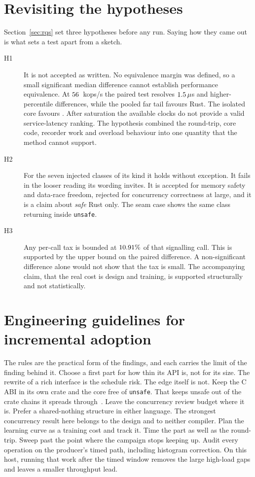 \documentclass[english,oneside,a4paper,censored,csm,software-track-2020]{HYthesisML}
\begin{document}
\section{Revisiting the hypotheses}\label{sec:hypotheses}
Section~\ref{sec:rqs} set three hypotheses before any run.
Saying how they came out is what sets a test apart from a sketch.

\begin{description}
  \item[H1] It is not accepted as written. No equivalence margin was defined,
        so a small significant median difference cannot establish
        performance equivalence. At $56$~kops/s the paired test resolves
        $1.5\,\mu$s and higher-percentile differences, while the
        pooled far tail favours Rust. The isolated core favours
        \BudgetCoreFaster{}. After saturation the available clocks do not
        provide a valid service-latency ranking. The hypothesis combined the
        round-trip, core code, recorder work and overload behaviour into one
        quantity that the method cannot support.
  \item[H2] For the seven injected classes of its kind it holds without
        exception. It fails in the looser reading its wording invites. It is
        accepted for memory safety and data-race freedom, rejected for
        concurrency correctness at large, and it is a claim about \emph{safe}
        Rust only. The seam case shows the same class returning inside
        \texttt{unsafe}.
  \item[H3] Any per-call tax is bounded at $10.91\%$ of that signalling call. This is
        supported by the upper bound on the paired difference. A non-significant
        difference alone would not show that the tax is small. The accompanying claim, that the real
        cost is design and training, is supported structurally and not
        statistically.
\end{description}

\section{Engineering guidelines for incremental adoption}\label{sec:guidelines}
The rules are the practical form of the findings, and each carries the
limit of the finding behind it. Choose a first part for how thin its API is,
not for its size. The rewrite of a rich interface is the
schedule risk. The edge itself is not. Keep the C ABI in its own crate and
the core free of \texttt{unsafe}. That keeps unsafe out of the crate
chains it spreads through~\cite{evans2020rust}. Leave the
concurrency review budget where it is. Prefer a shared-nothing structure in
either language. The strongest concurrency result here belongs to the design and
to neither compiler. Plan the learning curve as a training cost and track
it. Time the part as well as the round-trip. Sweep past the point where
the campaign stops keeping up. Audit every operation on the producer's timed
path, including histogram correction. On this host, running that work after
the timed window removes the large high-load gaps and leaves a smaller
throughput lead.
\end{document}
